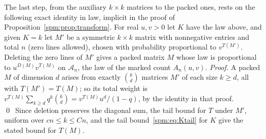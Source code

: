 \begin{writenote}
The last step, from the auxiliary $k\times k$ matrices to the packed ones,
rests on the following exact identity in law, implicit in the proof of
Proposition~\ref{spm:prop:transform}. For real $u,v>0$ let $K$ have the
law above, and given $K=k$ let $M'$ be a symmetric $k\times k$ matrix with
nonnegative entries and total $n$ (zero lines allowed), chosen with
probability proportional to $v^{T(M')}$. Deleting the zero lines of $M'$
gives a packed matrix $M$ whose law is proportional to $u^{D(M)}v^{T(M)}$
on $\mathcal A_n$, the law of the marked count $A_n(u,v)$. \emph{Proof.} A
packed $M$ of dimension $d$ arises from exactly $\binom kd$ matrices $M'$
of each size $k\ge d$, all with $T(M')=T(M)$; so its total weight is
$v^{T(M)}\sum_{k\ge d}q^k\binom kd=v^{T(M)}u^d/(1-q)$, by the identity in
that proof. \qed\ Since deletion preserves the diagonal sum, the tail
bound for $T$ under $M'$, uniform over $cn\le k\le Cn$, and the tail
bound~\eqref{spm:eq:Ktail} for $K$ give the stated bound for $T(M)$.
\end{writenote}
